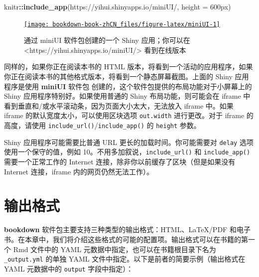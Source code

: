 \documentclass[
  12pt,
]{krantz}
\newenvironment{Shaded}{\begin{snugshade}}{\end{snugshade}}
\newcommand{\AttributeTok}[1]{\textcolor[rgb]{0.13,0.29,0.53}{#1}}
\newcommand{\FunctionTok}[1]{\textcolor[rgb]{0.13,0.29,0.53}{\textbf{#1}}}
\newcommand{\NormalTok}[1]{#1}
\newcommand{\SpecialCharTok}[1]{\textcolor[rgb]{0.81,0.36,0.00}{\textbf{#1}}}
\newcommand{\StringTok}[1]{\textcolor[rgb]{0.31,0.60,0.02}{#1}}
\let\oldhref\href
\renewcommand{\href}[2]{#2\footnote{\url{#1}}}
\theoremstyle{definition}
\theoremstyle{definition}
\theoremstyle{definition}
\theoremstyle{definition}
\theoremstyle{remark}
\begin{document}
\begin{Shaded}
\begin{Highlighting}[]
\NormalTok{knitr}\SpecialCharTok{::}\FunctionTok{include\_app}\NormalTok{(}\StringTok{\textquotesingle{}https://yihui.shinyapps.io/miniUI/\textquotesingle{}}\NormalTok{, }\AttributeTok{height =} \StringTok{\textquotesingle{}600px\textquotesingle{}}\NormalTok{)}
\end{Highlighting}
\end{Shaded}

\begin{figure}

{\centering \oldhref{https://yihui.shinyapps.io/miniUI/}{\texttt{[image: bookdown-book-zhCN\_files/figure-latex/miniUI-1]} }

}

\caption{通过 miniUI 软件包创建的一个 Shiny 应用；你可以在 <https://yihui.shinyapps.io/miniUI/> 看到在线版本}\label{fig:miniUI}
\end{figure}

\let\href\ooldhref

同样的，如果你正在阅读本书的 HTML 版本，将看到一个活动的应用程序，如果你正在阅读本书的其他格式版本，将看到一个静态屏幕截图。上面的 Shiny 应用程序是使用 \textbf{miniUI} 软件包 \citep{R-miniUI} 创建的，这个软件包提供的布局功能对于小屏幕上的 Shiny 应用程序特别好。如果使用普通的 Shiny 布局功能，则可能会在 iframe 中看到垂直和/或水平滚动条，因为页面大小太大，无法放入 iframe 中。如果 iframe 的默认宽度太小，可以使用区块选项 \texttt{out.width} 进行更改。对于 iframe 的高度，请使用 \texttt{include\_url()}/\texttt{include\_app()} 的 \texttt{height} 参数。

Shiny 应用程序可能需要比普通 URL 更长的加载时间。你可能需要对 \texttt{delay} 选项使用一个保守的值，例如 10。不用多加叙说，\texttt{include\_url()} 和 \texttt{include\_app()} 需要一个正常工作的 Internet 连接，除非你以前缓存了区块（但是如果没有 Internet 连接，iframe 内的网页仍然无法工作）。

\hypertarget{output-formats}{%
\chapter{输出格式}\label{output-formats}}

\textbf{bookdown} 软件包主要支持三种类型的输出格式：HTML、LaTeX/PDF 和电子书。在本章中，我们将介绍这些格式的可能的配置项。输出格式可以在书籍的第一个 Rmd 文件中的 YAML 元数据中指定，也可以在书籍根目录下名为 \texttt{\_output.yml} 的单独 YAML 文件中指定。以下是前者的简要示例（输出格式在 YAML 元数据中的 \texttt{output} 字段中指定）：
\end{document}
